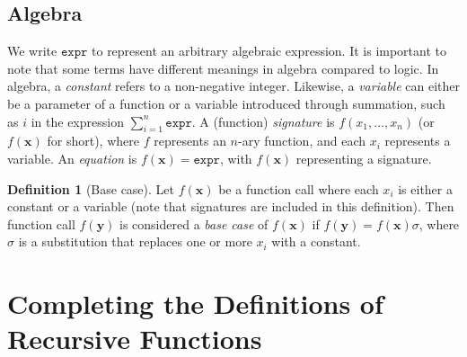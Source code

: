 \documentclass[letterpaper]{article} %
\theoremstyle{remark}
\theoremstyle{definition}
\newtheorem{definition}{Definition}
\newcommand{\expr}{\mathtt{expr}}
\begin{document}
\subsection{Algebra}\label{sec:algebra}

We write $\expr{}$ to represent an arbitrary algebraic expression. It is
important to note that some terms have different meanings in algebra compared to
logic. In algebra, a \emph{constant} refers to a non-negative integer. Likewise,
a \emph{variable} can either be a parameter of a function or a variable
introduced through summation, such as $i$ in the expression
$\sum_{i=1}^{n} \expr$. A (function) \emph{signature} is
$f(x_{1}, \dots, x_{n})$ (or $f(\mathbf{x})$ for short), where $f$ represents an
$n$-ary function, and each $x_{i}$ represents a variable. An \emph{equation} is
$f(\mathbf{x}) = \expr{}$, with $f(\mathbf{x})$ representing a signature.

\begin{definition}[Base case]\label{def:basecase}
  Let $f(\mathbf{x})$ be a function call where each $x_{i}$ is either a constant
  or a variable (note that signatures are included in this definition). Then
  function call $f(\mathbf{y})$ is considered a \emph{base case} of
  $f(\mathbf{x})$ if $f(\mathbf{y}) = f(\mathbf{x})\sigma$, where $\sigma$ is a
  substitution that replaces one or more $x_{i}$ with a constant.
\end{definition}

\section{Completing the Definitions of Recursive Functions}\label{sec:main}
\end{document}
